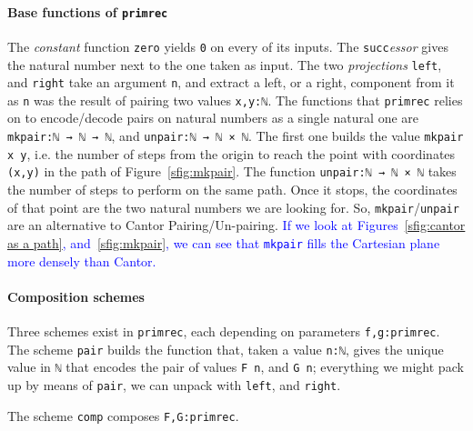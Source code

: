 \documentclass[preprint]{elsarticle}
\theoremstyle{remark}
\begin{document}
\paragraph{Base functions of {\normalfont \texttt{primrec}}}
The \emph{constant} function \lstinline|zero| yields \lstinline|0| on every of its inputs.
The \lstinline|succ|\emph{essor} gives the natural number next to the one taken as input.
The two \emph{projections} \lstinline|left|, and \lstinline|right| take an argument \lstinline|n|, and extract a left, or a right, component from it as \lstinline|n| was the result of pairing two values \lstinline|x,y:ℕ|. The functions that \lstinline|primrec| relies on to encode/decode pairs on natural numbers as a single natural one are \lstinline|mkpair:ℕ → ℕ → ℕ|, and \lstinline|unpair:ℕ → ℕ × ℕ|. The first one builds the value \lstinline|mkpair x y|, i.e. the number of steps from the origin to reach the point with coordinates \lstinline|(x,y)| in the path of Figure~\ref{sfig:mkpair}. The function \lstinline|unpair:ℕ → ℕ × ℕ| takes the number of steps to perform on the same path. Once it stops, the coordinates of that point are the two natural numbers we are looking for. So, \lstinline|mkpair|/\lstinline|unpair| are an alternative to Cantor Pairing/Un-pairing.
\textcolor{blue}{If we look at Figures~\ref{sfig:cantor as a path}, and~\ref{sfig:mkpair}, we can see that \lstinline|mkpair| fills the Cartesian plane more densely than Cantor.}

\paragraph{Composition schemes}
Three schemes exist in \lstinline|primrec|, each depending on parameters \lstinline|f,g:primrec|.
The scheme \lstinline|pair| builds the function that, taken a value \lstinline|n:ℕ|, gives the unique value in \lstinline|ℕ| that encodes the pair of values \lstinline|F n|, and \lstinline|G n|; everything we might pack up by means of \lstinline|pair|, we can unpack with \lstinline|left|, and \lstinline|right|.

The scheme \lstinline|comp| composes \lstinline|F,G:primrec|.
\end{document}
